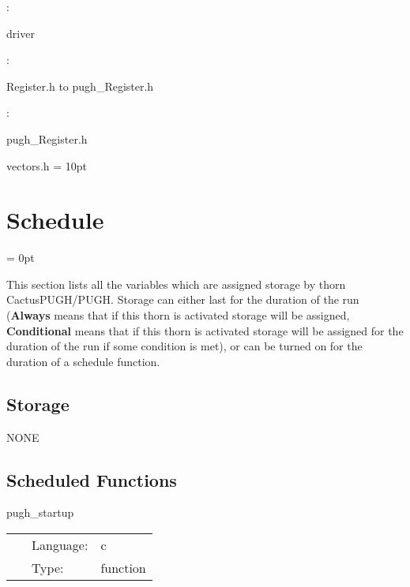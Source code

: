 \documentclass{article}
\begin{document}
: 

driver
\vspace{2mm}

\vspace{5mm}

: 



Register.h to pugh\_Register.h
\vspace{2mm}

: 

pugh\_Register.h

vectors.h
\vspace{2mm}\parskip = 10pt 

\section{Schedule} 


\parskip = 0pt


\noindent This section lists all the variables which are assigned storage by thorn CactusPUGH/PUGH.  Storage can either last for the duration of the run ({\bf Always} means that if this thorn is activated storage will be assigned, {\bf Conditional} means that if this thorn is activated storage will be assigned for the duration of the run if some condition is met), or can be turned on for the duration of a schedule function.


\subsection*{Storage}NONE
\subsection*{Scheduled Functions}
\vspace{5mm}


\hspace{5mm} pugh\_startup 

\hspace{5mm}{\it startup routine } 


\hspace{5mm}

 \begin{tabular*}{160mm}{cll} 
~ & Language:  & c \\ 
~ & Type:  & function \\ 
\end{tabular*} 
\end{document}
